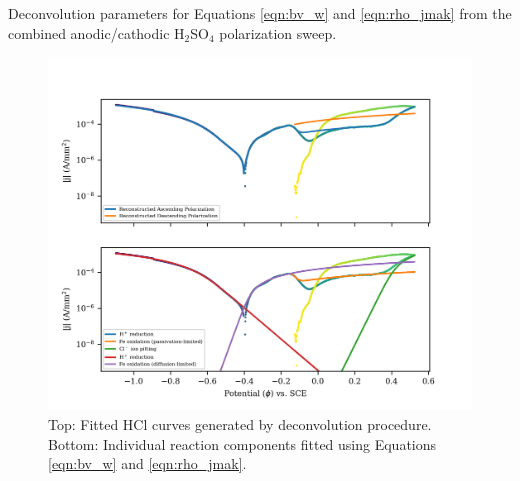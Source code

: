 	\begin{table}[h!]
		\centering
		
		
		\caption{Deconvolution parameters for Equations \ref{eqn:bv_w} and \ref{eqn:rho_jmak} from the combined anodic/cathodic H$_2$SO$_4$ polarization sweep.}
		\label{table:hcl_deconv}
	\end{table}


	\begin{figure}[h!]
		\centering
		\includegraphics[width=5.0in]{resources/fig_2a2.png}
		\caption{Top: Fitted HCl curves generated by deconvolution procedure.  Bottom: Individual reaction components fitted using Equations \ref{eqn:bv_w} and \ref{eqn:rho_jmak}.}
		\label{fig:hcl_deconv}
	\end{figure}


